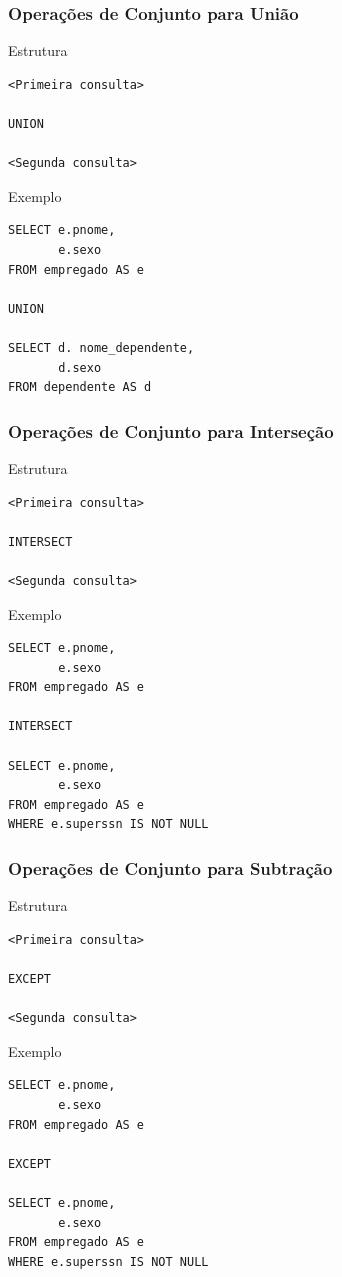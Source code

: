 \documentclass{beamer}
\begin{document}
\begin{frame}[fragile]
\frametitle{Operações de Conjunto para União}

\begin{block}{Estrutura}
	\begin{lstlisting}
<Primeira consulta>

UNION

<Segunda consulta>
	\end{lstlisting}
\end{block}\vfill

\begin{exampleblock}{Exemplo}
	\begin{lstlisting}
SELECT e.pnome,
       e.sexo
FROM empregado AS e

UNION

SELECT d. nome_dependente,
       d.sexo
FROM dependente AS d
	\end{lstlisting}
\end{exampleblock}
\end{frame}

\begin{frame}[fragile]
\frametitle{Operações de Conjunto para Interseção}

\begin{block}{Estrutura}
	\begin{lstlisting}
<Primeira consulta>

INTERSECT

<Segunda consulta>
	\end{lstlisting}
\end{block}\vfill

\begin{exampleblock}{Exemplo}
	\begin{lstlisting}
SELECT e.pnome,
       e.sexo
FROM empregado AS e

INTERSECT

SELECT e.pnome,
       e.sexo
FROM empregado AS e
WHERE e.superssn IS NOT NULL
	\end{lstlisting}
\end{exampleblock}
\end{frame}

\begin{frame}[fragile]
\frametitle{Operações de Conjunto para Subtração}

\begin{block}{Estrutura}
	\begin{lstlisting}
<Primeira consulta>

EXCEPT

<Segunda consulta>
\end{lstlisting}
\end{block}\vfill

\begin{exampleblock}{Exemplo}
	\begin{lstlisting}
SELECT e.pnome,
       e.sexo
FROM empregado AS e

EXCEPT

SELECT e.pnome,
       e.sexo
FROM empregado AS e
WHERE e.superssn IS NOT NULL
	\end{lstlisting}
\end{exampleblock}
\end{frame}
\end{document}
